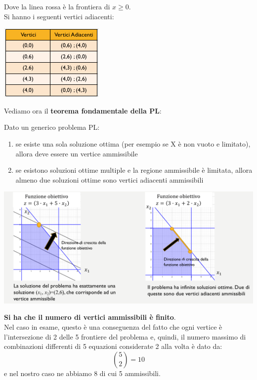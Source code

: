 \documentclass[a4paper,12pt, oneside]{book}
\begin{document}
Dove la linea rossa è la frontiera di $x\geq 0$.\\
Si hanno i seguenti vertici adiacenti:
\begin{center}
  \includegraphics[scale = 0.8]{img/simp5.png}
\end{center}
Vediamo ora il \textbf{teorema fondamentale della PL}:
\begin{teorema}
  Dato un generico problema PL:
  \begin{enumerate}
    \item se esiste una sola soluzione ottima (per esempio se X è non
    vuoto e limitato), allora deve essere un vertice ammissibile
    \item se esistono soluzioni ottime multiple e la regione
    ammissibile è limitata, allora almeno due soluzioni ottime sono
    vertici adiacenti ammissibili
  \end{enumerate}
  \begin{center}
    \includegraphics[scale = 0.8]{img/simp6.png}
  \end{center}
\end{teorema}
\textbf{Si ha che il numero di vertici ammissibili è finito}.\\
Nel caso in esame, questo è una conseguenza del fatto che
ogni vertice è l’intersezione di 2 delle 5 frontiere del
problema e, quindi, il numero massimo di combinazioni
differenti di 5 equazioni considerate 2 alla volta è dato da:
\[{5\choose{2}}=10\]
e nel nostro caso ne abbiamo 8 di cui 5 ammissibili.\\
\end{document}
